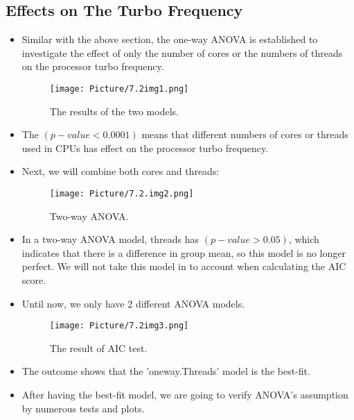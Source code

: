 \documentclass[a4paper]{article}
\begin{document}
\subsection{Effects on The Turbo Frequency}
\begin{itemize}
    \item[] Similar with the above section, the one-way ANOVA is established to investigate the effect of only the number of cores or the numbers of threads on the processor turbo frequency.

    \begin{figure}[H]
        \centering
        \texttt{[image: Picture/7.2img1.png]}
        \caption{The results of the two models.}
        \label{7.1.1}
    \end{figure}
    
    \item[] The $(p-value < 0.0001)$ means that different numbers of cores or threads used in CPUs has effect on the processor turbo frequency.
    
    \item[] Next, we will combine both cores and threads:
    
    \begin{figure}[H]
        \centering
        \texttt{[image: Picture/7.2.img2.png]}
        \caption{Two-way ANOVA.}
        \label{7.1.2}
    \end{figure}
    
    \item[] In a two-way ANOVA model, threads has $(p-value > 0.05)$, which indicates that there is a difference in group mean, so this model is no longer perfect. We will not take this model in to account when calculating the AIC score.
    
    \item[] Until now, we only have 2 different ANOVA models.

    \begin{figure}[H]
        \centering
        \texttt{[image: Picture/7.2img3.png]}
        \caption{The result of AIC test.}
        \label{7.1.3}
    \end{figure}
    
    \item[] The outcome shows that the 'oneway.Threads' model is the best-fit.
    
    \item[] After having the best-fit model, we are going to verify ANOVA's assumption by numerous tests and plots.


\end{itemize}
\end{document}
